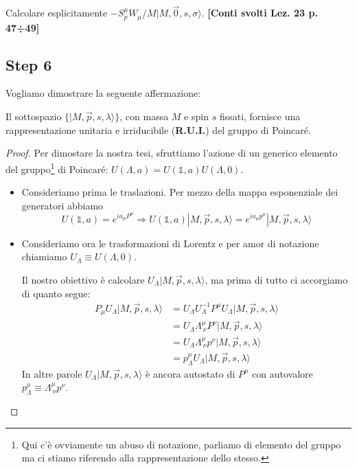 \documentclass[../main.tex]{subfiles}
\begin{document}
\begin{exercise}
    Calcolare esplicitamente \(-S_p^\mu W_\mu/M |M, \Vec{0}, s, \sigma\rangle\). \textbf{[Conti svolti Lez. 23 p. 47÷49]}
\end{exercise}

\subsection{Step 6}

Vogliamo dimostrare la seguente affermazione:
\begin{kaobox}
    Il sottospazio \(\big\{ |M,\Vec{p},s,\lambda\rangle \big\}\), con massa $M$ e spin $s$ fissati, fornisce una rappresentazione unitaria e irriducibile (\textbf{R.U.I.}) del gruppo di Poincaré.
\end{kaobox}
\begin{proof} Per dimostare la nostra tesi, sfruttiamo l'azione di un generico elemento del gruppo\footnote{Qui c'è ovviamente un abuso di notazione, parliamo di elemento del gruppo ma ci stiamo riferendo alla rappresentazione dello stesso.} di Poincaré: \(U(\Lambda, a) = U(\mathbb 1, a)U(\Lambda, 0) \).

\begin{itemize}
    \item Consideriamo prima le traslazioni. Per mezzo della mappa esponenziale dei generatori abbiamo 
    \[U(\mathbb 1, a) = e^{ia_\mu P^\mu} \Rightarrow 
    \boxed{U(\mathbb 1, a)|M,\Vec{p},s,\lambda\rangle = e^{ia_\mu p^\mu}|M,\Vec{p},s,\lambda\rangle}\]

    \item Consideriamo ora le trasformazioni di Lorentz e per amor di notazione chiamiamo $U_\Lambda\equiv U(\Lambda, 0)$. 

    Il nostro obiettivo è calcolare \(U_\Lambda|M,\Vec{p},s,\lambda\rangle\), ma prima di tutto ci accorgiamo di quanto segue:
    \begin{align*}
        P_\mu U_\Lambda|M,\Vec{p},s,\lambda\rangle &=U_\Lambda U_\Lambda ^{-1} P^\mu U_\Lambda |M,\Vec{p},s,\lambda\rangle\\
        &= U_\Lambda \Lambda^\mu_{~\nu}P^\nu |M,\Vec{p},s,\lambda\rangle\\
        &=U_\Lambda \Lambda^\mu_{~\nu}p^\nu |M,\Vec{p},s,\lambda\rangle\\
        &=p_\Lambda^\mu U_\Lambda |M,\Vec{p},s,\lambda\rangle
    \end{align*}
    In altre parole \(U_\Lambda|M,\Vec{p},s,\lambda\rangle\) è ancora autostato di $P^\mu$ con autovalore $p_\Lambda^\mu \equiv \Lambda^\mu_{~\nu}p^\nu$.


\end{itemize}
\end{proof}
\end{document}
